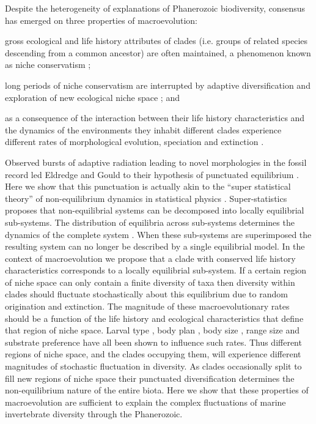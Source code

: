 \documentclass[12pt]{article}
\let\citep=\autocite
\begin{document}
Despite the heterogeneity of explanations of Phanerozoic
biodiversity, consensus has emerged on three properties of
macroevolution:
\begin{inparaenum}
\item gross ecological and life history attributes of clades
  (i.e. groups of related species descending from a common ancestor)
  are often maintained, a phenomenon known as niche conservatism
  \citep{roy2009range, hopkins2014};
\item long periods of niche conservatism are interrupted by adaptive
  diversification and exploration of new ecological niche space
  \citep{eldredgeGould1972, newman1985adaptive, hopkins2014}; and
\item as a consequence of the interaction between their life history
  characteristics and the dynamics of the environments they inhabit
  \citep{vrba1983} different clades experience different rates of
  morphological evolution, speciation and extinction
  \citep{simpson1953, sepkoski1984, holman1989, gilinsky1994}.
\end{inparaenum}

Observed bursts of adaptive radiation leading to novel morphologies in
the fossil record led Eldredge and Gould to their hypothesis of
punctuated equilibrium \citep{eldredgeGould1972}. Here we show that
this punctuation is actually akin to the ``super statistical theory''
of non-equilibrium dynamics in statistical physics
\citep{beck2003}. Super-statistics \citep{beck2003} proposes that
non-equilibrial systems can be decomposed into locally equilibrial
sub-systems. The distribution of equilibria across sub-systems
determines the dynamics of the complete system \citep{beck2003}. When
these sub-systems are superimposed the resulting system can no longer
be described by a single equilibrial model. In the context of
macroevolution we propose that a clade with conserved life history
characteristics corresponds to a locally equilibrial sub-system. If a
certain region of niche space can only contain a finite diversity of
taxa \citep{simpson1953, gavrilets2005, rabosky2009ecolLett, price2014}
then diversity within clades should fluctuate stochastically about
this equilibrium due to random origination and extinction. The
magnitude of these macroevolutionary rates should be a function of the
life history and ecological characteristics that define that region of
niche space. Larval type \citep{jablonski2008}, body plan
\citep{erwin2012}, body size \citep{harnik2011}, range size
\citep{harnik2011, foote2008paleobiol} and substrate preference
\citep{hopkins2014} have all been shown to influence such rates. Thus
different regions of niche space, and the clades occupying them, will
experience different magnitudes of stochastic fluctuation in
diversity. As clades occasionally split to fill new regions of niche
space their punctuated diversification determines the non-equilibrium
nature of the entire biota. Here we show that these properties of
macroevolution are sufficient to explain the complex fluctuations of
marine invertebrate diversity through the Phanerozoic.
\end{document}
